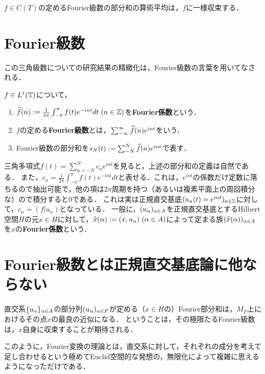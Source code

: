 \documentclass[uplatex,dvipdfmx]{jsreport}
\begin{document}
\begin{theorem}[Fejer]
    $f\in C(T)$の定めるFourier級数の部分和の算術平均は，$f$に一様収束する．
\end{theorem}

\section{Fourier級数}

\begin{tcolorbox}[colframe=ForestGreen, colback=ForestGreen!10!white,breakable,colbacktitle=ForestGreen!40!white,coltitle=black,fonttitle=\bfseries\sffamily,
title=]
    この三角級数についての研究結果の精緻化は，Fourier級数の言葉を用いてなされる．
\end{tcolorbox}

\begin{definition}
    $f\in L^1(\mathbb{T})$について，
    \begin{enumerate}
        \item $\widehat{f}(n):=\frac{1}{2\pi}\int^\pi_{-\pi}f(t)e^{-int}dt\;(n\in\mathbb{Z})$を\textbf{Fourier係数}という．
        \item $f$の定める\textbf{Fourier級数}とは，$\sum^\infty_{-\infty}\widehat{f}(n)e^{int}$をいう．
        \item Fourier級数の部分和を$s_N(t):=\sum^N_{-N}\widehat{f}(n)e^{int}$で表す．
    \end{enumerate}
\end{definition}
\begin{remarks}[Fourier係数とはなにか]
    三角多項式$f(t)=\sum^N_{n=-N}c_ne^{int}$を見ると，上述の部分和の定義は自然である．
    また，$c_n=\frac{1}{2\pi}\int^\pi_{-\pi}f(t)e^{-int}dt$と表せる．これは，$e^{int}$の係数だけ定数に落ちるので抽出可能で，他の項は$2\pi$周期を持つ（あるいは複素平面上の周回積分な）ので積分すると$0$である．
    これは実は正規直交基底$(u_n(t)=e^{int})_{n\in\mathbb{Z}}$に対して，$c_n=(f|u_n)$となっている．
    一般に，$(u_\alpha)_{\alpha\in A}$を正規直交基底とするHilbert空間$H$の元$x\in H$に対して，$\widehat{x}(\alpha):=(x,u_\alpha)\;(\alpha\in A)$によって定まる族$(\widehat{x}(\alpha))_{\alpha\in A}$を$x$の\textbf{Fourier係数}という．
\end{remarks}

\section{Fourier級数とは正規直交基底論に他ならない}

\begin{tcolorbox}[colframe=ForestGreen, colback=ForestGreen!10!white,breakable,colbacktitle=ForestGreen!40!white,coltitle=black,fonttitle=\bfseries\sffamily,
title=めっちゃ幾何学的だしHilbert空間的な行為！]
    直交系$\{u_\alpha\}_{\alpha\in A}$の部分列$(u_\alpha)_{\alpha\in F}$が定める（$x\in H$の）Fourier部分和は，$M_F$上におけるその点$x$の最良の近似になる．
    ということは，その極限たるFourier級数は，$x$自身に収束することが期待される．

    このように，Fourier変換の理論とは，直交系に対して，それぞれの成分を考えて足し合わせるという極めてEuclid空間的な発想の，無限化によって複雑に思えるようになっただけである．
\end{tcolorbox}
\end{document}
